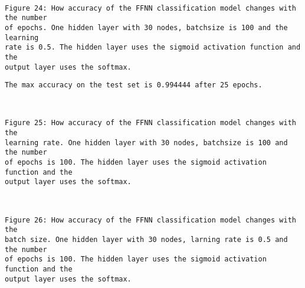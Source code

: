 \documentclass[11pt]{article}
\begin{document}
    \begin{center}
    \end{center}
    { \hspace*{\fill} \\}
    
    \begin{Verbatim}[commandchars=\\\{\}]
Figure 24: How accuracy of the FFNN classification model changes with the number
of epochs. One hidden layer with 30 nodes, batchsize is 100 and the learning
rate is 0.5. The hidden layer uses the sigmoid activation function and the
output layer uses the softmax.
    \end{Verbatim}

    \begin{Verbatim}[commandchars=\\\{\}]
The max accuracy on the test set is 0.994444 after 25 epochs.
    \end{Verbatim}


    \begin{center}
    \end{center}
    { \hspace*{\fill} \\}
    
    \begin{Verbatim}[commandchars=\\\{\}]
Figure 25: How accuracy of the FFNN classification model changes with the
learning rate. One hidden layer with 30 nodes, batchsize is 100 and the number
of epochs is 100. The hidden layer uses the sigmoid activation function and the
output layer uses the softmax.
    \end{Verbatim}


    \begin{center}
    \end{center}
    { \hspace*{\fill} \\}
    
    \begin{Verbatim}[commandchars=\\\{\}]
Figure 26: How accuracy of the FFNN classification model changes with the
batch size. One hidden layer with 30 nodes, larning rate is 0.5 and the number
of epochs is 100. The hidden layer uses the sigmoid activation function and the
output layer uses the softmax.
    \end{Verbatim}
\end{document}
